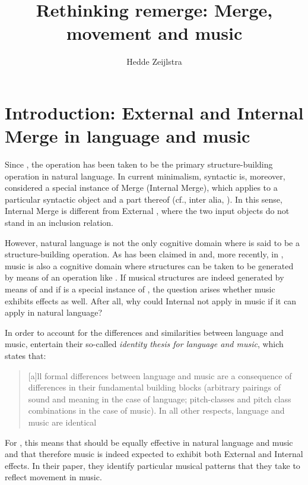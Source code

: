\documentclass[output=paper]{langsci/langscibook}
\author{Hedde Zeijlstra\affiliation{Georg-August-Universität Göttingen}}
\title{Rethinking remerge: Merge, movement and music}
\begin{document}
\glsresetall{}
\maketitle

\section{Introduction: External and Internal Merge in language and
music}\label{sec:26.1}

Since \citet{Chomsky1995}, the operation  has been taken to be the
primary structure-building operation in natural language. In current
minimalism, syntactic  is, moreover, considered a special instance of
Merge (Internal Merge), which applies to a particular syntactic object and a
part thereof (cf., inter alia, \citealt{Chomsky2005}). In this sense, Internal
Merge is different from External , where the two input objects do
not stand in an inclusion relation.

However, natural language is not the only cognitive domain where  is
said to be a structure-building operation. As has been claimed in
\citet{LerJac1983} and, more recently, in \citet{KatzPes2011}, music is also a
cognitive domain where structures can be taken to be generated by means of an
operation like . If musical structures are indeed generated by means
of  and if  is a special instance of , the
question arises whether music exhibits  effects as well. After all, why
could Internal  not apply in music if it can apply in natural
language?

In order to account for the differences and similarities between language and
music, \citet{KatzPes2011} entertain their so-called \emph{identity thesis for
language and music}, which states
that:

\blockquote[{\citealt[3]{KatzPes2011}}][.]{[a]ll formal differences
    between language and music are a consequence of differences in their
    fundamental building blocks (arbitrary pairings of sound and meaning in the
    case of language; pitch-classes and pitch class combinations in the case of
music). In all other   respects, language and music are identical}

For \citeauthor{KatzPes2011}, this means that  should be equally
effective in natural language and music and that therefore music is indeed
expected to exhibit both External and Internal  effects. In their
paper, they identify particular musical patterns that they take to reflect
movement in music.
\end{document}
